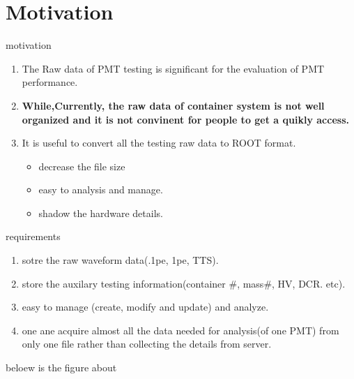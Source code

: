 
\section{Motivation}
\begin{frame}{ motivation}
\begin{enumerate}
\item 	The Raw data of PMT testing is significant for the evaluation of PMT performance. 
\item \textbf{While,Currently, the raw data of container system is not well organized and it is  not convinent for people to get a quikly access.  }
\item \alert{It is useful to convert all the testing raw data to ROOT format.}
\begin{itemize}
\item decrease the file size
\item easy to analysis and manage.
\item shadow the hardware details.
\end{itemize}
\end{enumerate}
\end{frame}
\begin{frame}{requirements}
\begin{enumerate}
\item sotre the raw waveform data(.1pe, 1pe, TTS).
\item store the auxilary testing information(container #, mass#, HV, DCR. etc).
\item easy to manage (create, modify and update) and analyze.
\item \alert{one ane acquire almost all the data needed for analysis(of one PMT) from only one file} rather than collecting the details from server.

\end{enumerate}
beloew is the figure about 
\end{frame}
